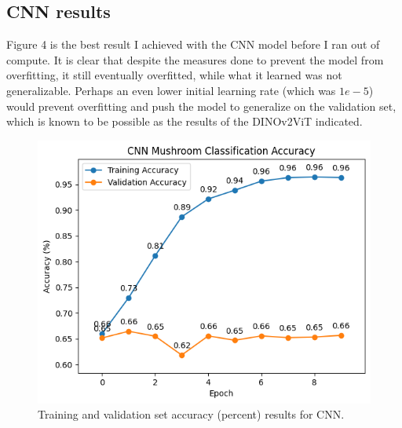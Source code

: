 \documentclass[journal]{IEEEtran}
\begin{document}
\subsection{CNN results}
Figure 4 is the best result I achieved with the CNN model before I ran out of compute. It is clear that despite the measures done to prevent the model from overfitting, it still eventually overfitted, while what it learned was not generalizable. Perhaps an even lower initial learning rate (which was $1e-5$) would prevent overfitting and push the model to generalize on the validation set, which is known to be possible as the results of the DINOv2ViT indicated.
\begin{figure}[H]
    \includegraphics[width=\linewidth]{imgs/cnn_result.png}
    \caption{Training and validation set accuracy (percent) results for CNN.}
\end{figure}
\end{document}

